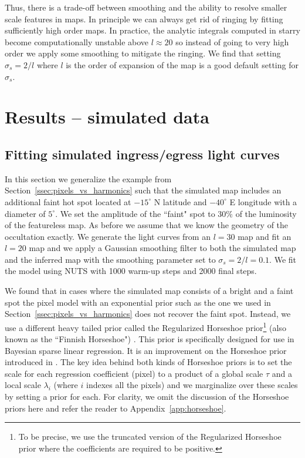 \documentclass[modern]{aastex62}
\begin{document}
Thus, there is a trade-off between smoothing and the ability to resolve smaller scale features
in maps. 
In principle we can always get rid of ringing by fitting sufficiently high order maps.
In practice, the analytic integrals computed in \textsf{starry} become computationally unstable above $l\approx 20$ so instead of going to very high order we apply some smoothing to mitigate the ringing.
We find that setting $\sigma_s=2/l$ where $l$ is the order of expansion of the map  is a good default setting for $\sigma_s$.

\section{Results -- simulated data}
\label{sec:results_sim}
\subsection{Fitting simulated ingress/egress light curves}
\label{ssec:fitting_sim_ingress_egress}
In this section we generalize the example from Section~\ref{ssec:pixels_vs_harmonics} such that the simulated map includes an additional faint hot spot located at $-15^\circ$ N latitude and $-40^\circ$ E longitude with a diameter of $5^\circ$.
We set the amplitude of the ``faint" spot to 30\% of the luminosity of the featureless map.
As before we assume that we know the geometry of the occultation exactly.
We generate the light curves from an $l=30$ map and fit an $l=20$ map and we apply a Gaussian smoothing filter to both the simulated map and the inferred map with the smoothing parameter set to $\sigma_s=2/l=0.1$.
We fit the model using NUTS with 1000 warm-up steps and 2000 final steps. 

We found that in cases where the simulated map consists of a bright and a faint spot the pixel model with an exponential prior such as the one we used in Section~\ref{ssec:pixels_vs_harmonics} does not recover the faint spot. 
Instead, we use a different heavy tailed prior called the Regularized Horseshoe prior\footnote{To be precise, we use the truncated version of the Regularized Horseshoe prior where the coefficients are required to be positive.} (also known as the ``Finnish Horseshoe") \citep{piironen2017}.
This prior is specifically designed for use in Bayesian sparse linear regression. 
It is an improvement on the Horseshoe prior introduced in \cite{carvalho2010a}.
The key idea behind both kinds of Horseshoe priors is to set the scale for each regression coefficient (pixel) to a product of a global scale $\tau$ and a local scale $\lambda_i$ (where $i$ indexes all the pixels) and we marginalize over these scales by setting a prior for each. 
For clarity, we omit the discussion of  the Horseshoe priors here and refer the reader to Appendix~\ref{app:horseshoe}.
\end{document}
